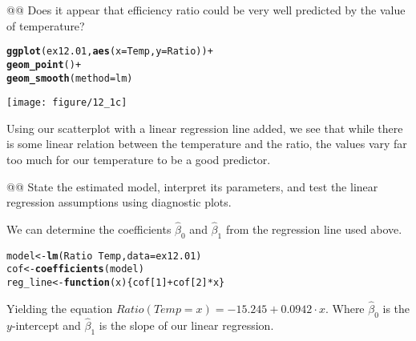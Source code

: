 \documentclass[10pt]{article}\usepackage[]{graphicx}\usepackage[]{xcolor}
\makeatletter
\def\maxwidth{ %
  \ifdim\Gin@nat@width>\linewidth
    \linewidth
  \else
    \Gin@nat@width
  \fi
}
\newcommand{\hlnum}[1]{\textcolor[rgb]{0.686,0.059,0.569}{#1}}%
\newcommand{\hlopt}[1]{\textcolor[rgb]{0,0,0}{#1}}%
\newcommand{\hlstd}[1]{\textcolor[rgb]{0.345,0.345,0.345}{#1}}%
\newcommand{\hlkwa}[1]{\textcolor[rgb]{0.161,0.373,0.58}{\textbf{#1}}}%
\newcommand{\hlkwb}[1]{\textcolor[rgb]{0.69,0.353,0.396}{#1}}%
\newcommand{\hlkwc}[1]{\textcolor[rgb]{0.333,0.667,0.333}{#1}}%
\newcommand{\hlkwd}[1]{\textcolor[rgb]{0.737,0.353,0.396}{\textbf{#1}}}%
\newenvironment{kframe}{%
 \def\at@end@of@kframe{}%
 \ifinner\ifhmode%
  \def\at@end@of@kframe{\end{minipage}}%
  \begin{minipage}{\columnwidth}%
 \fi\fi%
 \def\FrameCommand##1{\hskip\@totalleftmargin \hskip-\fboxsep
 \colorbox{shadecolor}{##1}\hskip-\fboxsep
     \hskip-\linewidth \hskip-\@totalleftmargin \hskip\columnwidth}%
 \MakeFramed {\advance\hsize-\width
   \@totalleftmargin\z@ \linewidth\hsize
   \@setminipage}}%
 {\par\unskip\endMakeFramed%
 \at@end@of@kframe}
\newenvironment{knitrout}{}{} %
\makeatother
\begin{document}
\begin{easylist}[enumerate]
    @@ Does it appear that efficiency ratio could be very well predicted by the value of temperature?

\begin{knitrout}
\color{fgcolor}\begin{kframe}
\begin{alltt}
         \hlkwd{ggplot}\hlstd{(ex12.01,} \hlkwd{aes}\hlstd{(}\hlkwc{x}\hlstd{=Temp,} \hlkwc{y}\hlstd{=Ratio))} \hlopt{+}
            \hlkwd{geom_point}\hlstd{()} \hlopt{+}
            \hlkwd{geom_smooth}\hlstd{(}\hlkwc{method}\hlstd{=lm)}
\end{alltt}
\end{kframe}

{\centering \texttt{[image: figure/12\_1c]} 

}



\end{knitrout}


    Using our scatterplot with a linear regression line added, we see that while there is some linear relation between
    the temperature and the ratio, the values vary far too much for our temperature to be a good predictor.

    @@ State the estimated model, interpret its parameters, and test the linear regression assumptions using diagnostic
    plots.\newline

    We can determine the coefficients $\hat{\beta}_0$ and $\hat{\beta}_1$ from the regression line used above.

\begin{knitrout}
\color{fgcolor}\begin{kframe}
\begin{alltt}
         \hlstd{model} \hlkwb{<-} \hlkwd{lm}\hlstd{(Ratio}\hlopt{~}\hlstd{Temp,} \hlkwc{data}\hlstd{=ex12.01)}
         \hlstd{cof} \hlkwb{<-} \hlkwd{coefficients}\hlstd{(model)}
         \hlstd{reg_line} \hlkwb{<-} \hlkwa{function}\hlstd{(}\hlkwc{x}\hlstd{) \{ cof[}\hlnum{1}\hlstd{]} \hlopt{+} \hlstd{cof[}\hlnum{2}\hlstd{]} \hlopt{*} \hlstd{x \}}
\end{alltt}
\end{kframe}
\end{knitrout}


    Yielding the equation $\boxed{Ratio(Temp=x) = -15.245 + 0.0942 \cdot x}$. Where $\hat{\beta}_0$ is
    the $y$-intercept and $\hat{\beta}_1$ is the slope of our linear regression.\newline


\end{easylist}
\end{document}
